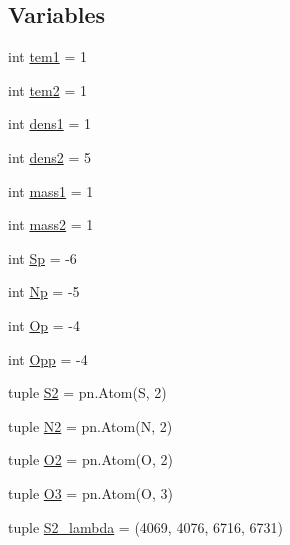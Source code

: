 \subsection*{Variables}
\begin{DoxyCompactItemize}
\item 
int \hyperlink{namespacepyneb_1_1test_1_1multi__comp_ab8fc3832c90b6cbaed3c320eff36daf2}{tem1} = 1
\item 
int \hyperlink{namespacepyneb_1_1test_1_1multi__comp_ae01807adbb34e2f438764f04a898750f}{tem2} = 1
\item 
int \hyperlink{namespacepyneb_1_1test_1_1multi__comp_a2078ba8e90b451762c3c912b5644b070}{dens1} = 1
\item 
int \hyperlink{namespacepyneb_1_1test_1_1multi__comp_a29f2b08d213d1af5d448ea758345f0a1}{dens2} = 5
\item 
int \hyperlink{namespacepyneb_1_1test_1_1multi__comp_a0f4f1d8d7cca8ff5626b7e39261d92d5}{mass1} = 1
\item 
int \hyperlink{namespacepyneb_1_1test_1_1multi__comp_ad8cdd898f34b451cac9f738570b8fde6}{mass2} = 1
\item 
int \hyperlink{namespacepyneb_1_1test_1_1multi__comp_a7dc22733a7dc31447af80b017a4366c0}{Sp} = -\/6
\item 
int \hyperlink{namespacepyneb_1_1test_1_1multi__comp_a730973bb5d66cde8c39de757702e2116}{Np} = -\/5
\item 
int \hyperlink{namespacepyneb_1_1test_1_1multi__comp_acb5b32b16511efc23433aaade5b41544}{Op} = -\/4
\item 
int \hyperlink{namespacepyneb_1_1test_1_1multi__comp_abd16a9dd120d958a9edbf2ec1322c026}{Opp} = -\/4
\item 
tuple \hyperlink{namespacepyneb_1_1test_1_1multi__comp_a8d90734f103bcd80bced4c908bfeb493}{S2} = pn.\+Atom(\textquotesingle{}S\textquotesingle{}, 2)
\item 
tuple \hyperlink{namespacepyneb_1_1test_1_1multi__comp_a7ee3bebe71b0ebfd1ae4e1026bf854d2}{N2} = pn.\+Atom(\textquotesingle{}N\textquotesingle{}, 2)
\item 
tuple \hyperlink{namespacepyneb_1_1test_1_1multi__comp_a823eed65ec2dc8d8c130674f0fed04c7}{O2} = pn.\+Atom(\textquotesingle{}O\textquotesingle{}, 2)
\item 
tuple \hyperlink{namespacepyneb_1_1test_1_1multi__comp_ac49b06657ba235ae0972deab3dd715ab}{O3} = pn.\+Atom(\textquotesingle{}O\textquotesingle{}, 3)
\item 
tuple \hyperlink{namespacepyneb_1_1test_1_1multi__comp_aac760bd0cfecb07df5afa64ec3f82947}{S2\+\_\+lambda} = (4069, 4076, 6716, 6731)

\end{DoxyCompactItemize}
